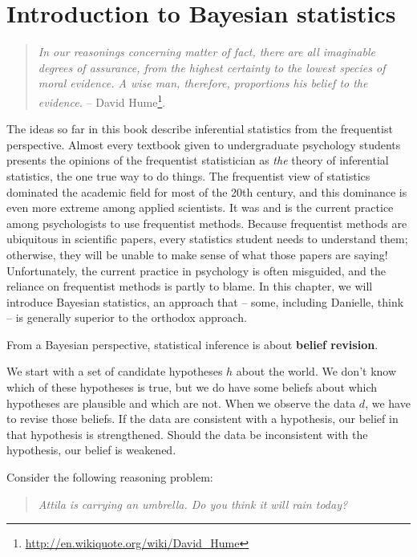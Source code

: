 \documentclass[
]{book}
\theoremstyle{definition}
\theoremstyle{definition}
\theoremstyle{definition}
\theoremstyle{definition}
\theoremstyle{remark}
\begin{document}
\hypertarget{bayes}{%
\chapter{Introduction to Bayesian statistics}\label{bayes}}

\begin{quote}
\emph{In our reasonings concerning matter of fact, there are all imaginable degrees of assurance, from the highest certainty to the lowest species of moral evidence. A wise man, therefore, proportions his belief to the evidence.}
-- David Hume\footnote{\url{http://en.wikiquote.org/wiki/David_Hume}}.
\end{quote}

The ideas so far in this book describe inferential statistics from the frequentist perspective. Almost every textbook given to undergraduate psychology students presents the opinions of the frequentist statistician as \emph{the} theory of inferential statistics, the one true way to do things. The frequentist view of statistics dominated the academic field for most of the 20th century, and this dominance is even more extreme among applied scientists. It was and is the current practice among psychologists to use frequentist methods. Because frequentist methods are ubiquitous in scientific papers, every statistics student needs to understand them; otherwise, they will be unable to make sense of what those papers are saying! Unfortunately, the current practice in psychology is often misguided, and the reliance on frequentist methods is partly to blame. In this chapter, we will introduce Bayesian statistics, an approach that -- some, including Danielle, think -- is generally superior to the orthodox approach.

From a Bayesian perspective, statistical inference is about \textbf{belief revision}.

We start with a set of candidate hypotheses \(h\) about the world. We don't know which of these hypotheses is true, but we do have some beliefs about which hypotheses are plausible and which are not. When we observe the data \(d\), we have to revise those beliefs. If the data are consistent with a hypothesis, our belief in that hypothesis is strengthened. Should the data be inconsistent with the hypothesis, our belief is weakened.

Consider the following reasoning problem:

\begin{quote}
\emph{Attila is carrying an umbrella. Do you think it will rain today?}
\end{quote}
\end{document}
